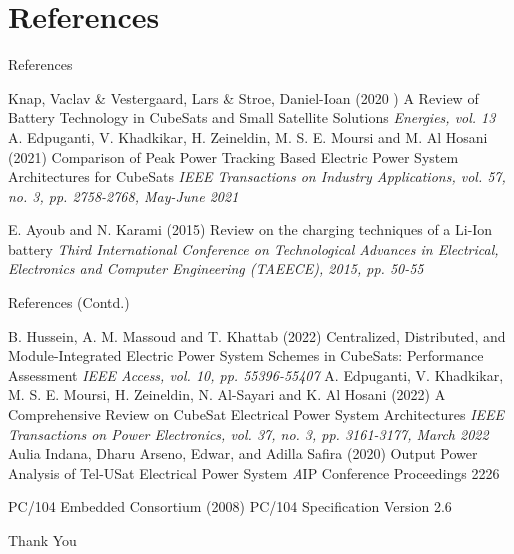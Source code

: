 \documentclass[aspectratio=169]{beamer}
\begin{document}
				\section{References}
				\begin{frame}{References}
					
					\begin{thebibliography}{9}
						
						Knap, Vaclav \& Vestergaard, Lars \& Stroe, Daniel-Ioan (2020	)
						\newblock A Review of Battery Technology in CubeSats
						and Small Satellite Solutions
						\newblock \emph{Energies, vol. 13}	
						A. Edpuganti, V. Khadkikar, H. Zeineldin, M. S. E. Moursi and M. Al Hosani (2021)
						\newblock Comparison of Peak Power Tracking Based Electric Power System Architectures for CubeSats
						\newblock \emph{IEEE Transactions on Industry Applications, vol. 57, no. 3, pp. 2758-2768, May-June 2021}
						
						E. Ayoub and N. Karami (2015)
						\newblock Review on the charging techniques of a Li-Ion battery
						\newblock \emph{Third International Conference on Technological Advances in Electrical, Electronics and Computer Engineering (TAEECE), 2015, pp. 50-55}
					\end{thebibliography}
				\end{frame}
				\begin{frame}{References (Contd.)}
					
					\begin{thebibliography}{9}
						
						\bibitem[4]{p1}
						B. Hussein, A. M. Massoud and T. Khattab (2022)
						\newblock Centralized, Distributed, and Module-Integrated Electric Power System Schemes in CubeSats: Performance Assessment
						\newblock \emph{ IEEE Access, vol. 10, pp. 55396-55407}
						A. Edpuganti, V. Khadkikar, M. S. E. Moursi, H. Zeineldin, N. Al-Sayari and K. Al Hosani (2022)
						\newblock A Comprehensive Review on CubeSat Electrical Power System Architectures
						\newblock \emph { IEEE Transactions on Power Electronics, vol. 37, no. 3, pp. 3161-3177, March 2022}
						\bibitem[6]{p1}
						Aulia Indana, Dharu Arseno, Edwar, and Adilla Safira (2020)
						\newblock Output Power Analysis of Tel-USat Electrical Power System 
						\newblock \emph  AIP Conference Proceedings 2226
						
						\bibitem[7]{p1}
						PC/104 Embedded Consortium (2008)
						\newblock PC/104 Specification
						Version 2.6
						
						
						
						
						
						
						
						
						
					\end{thebibliography}
				\end{frame}
				
				\begin{frame}
					\huge \center Thank You
					
				\end{frame}
			
\end{document}
